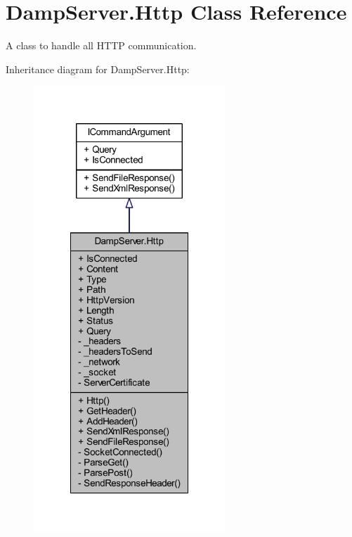 \hypertarget{class_damp_server_1_1_http}{\section{Damp\-Server.\-Http Class Reference}
\label{class_damp_server_1_1_http}
}


A class to handle all H\-T\-T\-P communication.  




Inheritance diagram for Damp\-Server.\-Http\-:
\nopagebreak
\begin{figure}[H]
\begin{center}
\leavevmode
\includegraphics[width=204pt]{class_damp_server_1_1_http__inherit__graph}
\end{center}
\end{figure}


